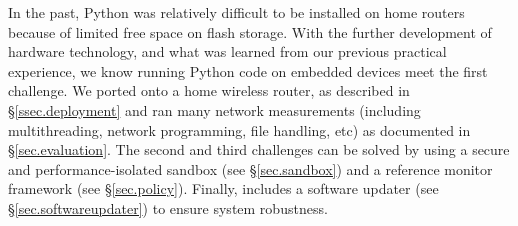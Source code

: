 In the past, Python was relatively difficult to be installed on home routers because of limited free space on flash storage. With the further development of hardware technology, and what was learned from our previous practical experience, we know running Python code on embedded devices meet the first challenge. We ported \sysname onto a home wireless router, as described in \S{\ref{ssec.deployment}} and ran many network measurements (including multithreading, network programming, file handling, etc) as documented in \S{\ref{sec.evaluation}}. The second and third challenges can be solved by using a secure and performance-isolated sandbox (see \S{\ref{sec.sandbox}}) and a reference monitor framework (see \S{\ref{sec.policy}}). Finally, \sysname includes a software updater (see \S{\ref{sec.softwareupdater}}) to ensure system robustness.

